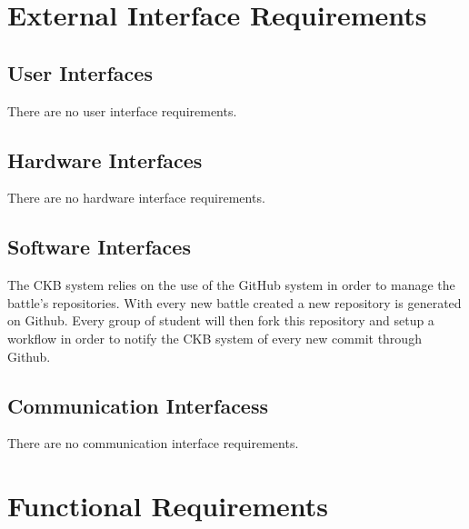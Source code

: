 \section{External Interface Requirements}
\subsection{User Interfaces}
There are no user interface requirements.

\subsection{Hardware Interfaces}
There are no hardware interface requirements.

\subsection{Software Interfaces}
The \ac{CKB} system relies on the use of the GitHub system in order to manage the battle's repositories. With every new battle created a new repository is generated on Github. Every group of student will then fork this repository and setup a workflow in order to notify the \ac{CKB} system of every new commit through Github.

\subsection{Communication Interfacess}
There are no communication interface requirements.

\newpage
\section{Functional Requirements}
